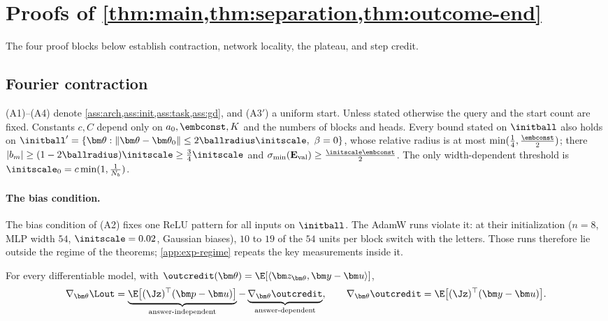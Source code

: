 \section{Proofs of \texorpdfstring{\cref{thm:main,thm:separation,thm:outcome-end}}{Theorems 1-3}}
\label{app:damping-proof}
\label{app:mainproofs}

The four proof blocks below establish contraction, network locality, the plateau, and step credit.

\subsection{Fourier contraction}
\label{app:C-fourier}
\label{app:assumptions}




(A1)--(A4) denote \cref{ass:arch,ass:init,ass:task,ass:gd}, and (A3$'$) a uniform start. Unless stated otherwise the query and the start
count are fixed. Constants $c,C$ depend only on $a_0,\embconst,K$ and the numbers of blocks and heads. Every bound stated on $\initball$ also
holds on $\initball'=\{\bm\theta:\|\bm\theta-\bm\theta_0\|\le2\ballradius\initscale,\ \beta=0\}$, whose relative radius is at most $\min(\frac{1}{4},\frac{\embconst}{2})$; there
$|b_m|\ge(1-2\ballradius)\initscale\ge\frac{3}{4}\initscale$ and $\sigma_{\min}(\mathbf E_{\mathrm{val}})\ge\frac{\initscale\embconst}{2}$. The only width-dependent threshold is $\initscale_0=c\min(1,\frac{1}{N_b})$.

\paragraph{The bias condition.}\label{rem:two-block-bias} The bias condition of (A2) fixes one ReLU pattern for all inputs on $\initball$. The AdamW runs violate it: at their initialization
($n=8$, MLP width $54$, $\initscale=0.02$, Gaussian biases), $10$ to $19$ of the $54$ units per block switch with the letters. Those
runs therefore lie outside the regime of the theorems; \cref{app:exp-regime} repeats the key measurements inside it.


\begin{lemma}
\label{lem:gradient-split}
For every differentiable model, with $\outcredit(\bm\theta)=\E[\langle\bm z_{\bm\theta},\bm y-\bm u\rangle]$,
\[
 \nabla_{\bm\theta}\Lout=\underbrace{\E\bigl[(\Jz)^\top(\bm p-\bm u)\bigr]}_{\text{answer-independent}}-\underbrace{\nabla_{\bm\theta}\outcredit}_{\text{answer-dependent}},\qquad
 \nabla_{\bm\theta}\outcredit=\E\bigl[(\Jz)^\top(\bm y-\bm u)\bigr].
\]
\end{lemma}

